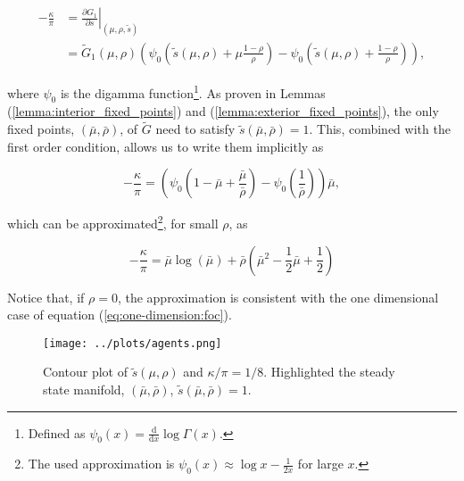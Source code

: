 \documentclass[../../main.tex]{subfiles}
\begin{document}
\begin{equation}
  \begin{split}
    -\frac{\kappa}{\pi} &= \left. \frac{\partial G_1}{\partial s} \right\vert_{(\mu, \rho, \tilde{s})}  \\
    &= \tilde{G}_1(\mu, \rho) \left(\psi_0\left(\tilde{s}(\mu, \rho) + \mu \frac{1 - \rho}{\rho} \right) - \psi_0\left(\tilde{s}(\mu, \rho) + \frac{1 - \rho}{\rho} \right)  \right),
  \end{split}
\end{equation}

where $\psi_0$ is the digamma function\footnote{
  Defined as $\psi_0(x) = \frac{\text{d}}{\text{d}x} \log \Gamma(x)$.
}. As proven in Lemmas (\ref{lemma:interior_fixed_points}) and (\ref{lemma:exterior_fixed_points}), the only fixed points, $(\bar{\mu}, \bar{\rho})$, of $\tilde{G}$ need to satisfy $\tilde{s}(\bar{\mu}, \bar{\rho})= 1$. This, combined with the first order condition, allows us to write them implicitly as

\begin{equation} \label{eq:exact-foc}
  -\frac{\kappa}{\pi} = \left( \psi_0\left(1 - \bar{\mu} + \frac{ \bar{\mu} }{\bar{\rho}} \right) - \psi_0\left(\frac{1}{\bar{\rho}} \right) \right) \bar{\mu},
\end{equation}

which can be approximated\footnote{The used approximation is $\psi_0(x) \approx \log x - \frac{1}{2x}$ for large $x$.}, for small $\rho$, as

\begin{equation}
  -\frac{\kappa}{\pi} = \bar{\mu}\log(\bar{\mu}) + \bar{\rho} \left( \bar{\mu}^2 - \frac{1}{2} \bar{\mu} + \frac{1}{2} \right)
\end{equation}

Notice that, if $\rho = 0$, the approximation is consistent with the one dimensional case of equation (\ref{eq:one-dimension:foc}).

\begin{figure}[H]
  \centering
  \texttt{[image: ../plots/agents.png]}
  \caption{Contour plot of $\tilde{s}(\mu, \rho)$ and $\kappa / \pi = 1 / 8$. Highlighted the steady state manifold, $(\bar{\mu}, \bar{\rho})$, $\tilde{s}(\bar{\mu}, \bar{\rho}) = 1$.}
  \label{fig:agents-optimum}
\end{figure}
\end{document}

